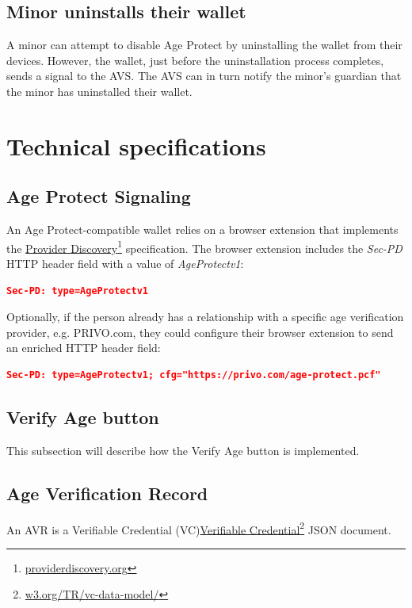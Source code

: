 \documentclass[11pt, oneside]{article}   	%
\newcommand{\hyperfootnote}[1][]{\def\ArgI{{#1}}\hyperfootnoteRelay}
\newcommand\hyperfootnoteRelay[2][]{\href{#1#2}{\ArgI}\footnote{\href{#1#2}{#2}}}
\begin{document}
\subsection{Minor uninstalls their wallet}

A minor can attempt to disable Age Protect by uninstalling the wallet from their devices. However, the wallet, just before the uninstallation process completes, sends a signal to the AVS. The AVS can in turn notify the minor's guardian that the minor has uninstalled their wallet.

\section{Technical specifications}

\subsection{Age Protect Signaling}
 
An Age Protect-compatible wallet relies on a browser extension that implements the \hyperfootnote[Provider Discovery][https://]{providerdiscovery.org} specification. The browser extension includes the \emph{Sec-PD} HTTP header field with a value of \emph{AgeProtectv1}:
\begin{lstlisting}[language=json,firstnumber=1]
	Sec-PD: type=AgeProtectv1
\end{lstlisting}

Optionally, if the person already has a relationship with a specific age verification provider, e.g. PRIVO.com, they could configure their browser extension to send an enriched HTTP header field:
\begin{lstlisting}[language=json,firstnumber=1]
	Sec-PD: type=AgeProtectv1; cfg="https://privo.com/age-protect.pcf"
\end{lstlisting}
\subsection{Verify Age button}

This subsection will describe how the Verify Age button is implemented. 

\subsection{Age Verification Record}

An AVR is a Verifiable Credential (VC)\hyperfootnote[Verifiable Credential][https://]{w3.org/TR/vc-data-model/} JSON document. 
\end{document}
